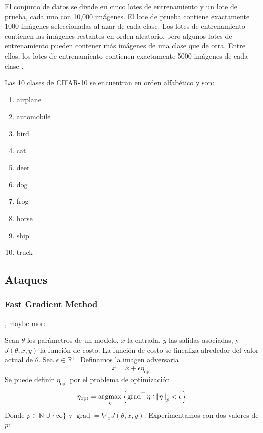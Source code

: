 El conjunto de datos se divide en cinco lotes de entrenamiento y un lote de prueba, cada uno con 10,000 imágenes. El lote de prueba contiene exactamente 1000 imágenes seleccionadas al azar de cada clase. Los lotes de entrenamiento contienen las imágenes restantes en orden aleatorio, pero algunos lotes de entrenamiento pueden contener más imágenes de una clase que de otra. Entre ellos, los lotes de entrenamiento contienen exactamente 5000 imágenes de cada clase \cite{cifarsite}. 

Las 10 clases de CIFAR-10 se encuentran en orden alfabético y son:
\begin{multicols}{5}
\begin{enumerate}
    \item airplane
    \item automobile
    \item bird
    \item cat
    \item deer
    \item dog
    \item frog
    \item horse
    \item ship
    \item truck
\end{enumerate}
\end{multicols}


\subsection{Ataques}

\subsubsection{Fast Gradient Method}
\cite{goodfellow2015explaining}, maybe more

Sean $\theta$ los parámetros de un modelo, $x$ la entrada, $y$ las salidas asociadas, y $J(\theta, x, y)$ la función de costo. La función de costo se linealiza alrededor del valor actual de $\theta$. Sea $\epsilon \in \mathbb{R}^+$. Definamos la imagen adversaria 
\[\tilde{x} = x + \epsilon \eta_{\text{opt}}\]
Se puede definir $\eta_{\text{opt}}$ por el problema de optimización
\[\eta_{\text{opt}} = \operatornamewithlimits{argmax}_{\eta}\left\{ \operatorname{grad} ^\top \eta: \norm{\eta}_p< \epsilon\right\}\]
Donde $p \in \mathbb{N} \cup \{\infty\}$ y $\operatorname{grad} = \nabla_x J(\theta, x, y)$. Experimentamos con dos valores de $p$:
    
